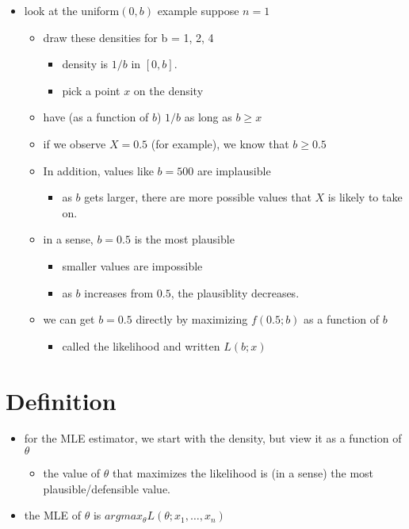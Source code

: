 \begin{itemize}
\item look at the uniform$(0,b)$ example suppose $n = 1$
\begin{itemize}
\item draw these densities for b = 1, 2, 4
\begin{itemize}
\item density is $1/b$ in $[0,b]$.
\item pick a point $x$ on the density
\end{itemize}
\item have (as a function of $b$) $1/b$ as long as $b \geq x$
\item if we observe $X = 0.5$ (for example), we know that $b \geq 0.5$
\item In addition, values like $b = 500$ are implausible
\begin{itemize}
\item as $b$ gets larger, there are more possible values that $X$ is
         likely to take on.
\end{itemize}
\item in a sense, $b = 0.5$ is the most plausible
\begin{itemize}
\item smaller values are impossible
\item as $b$ increases from $0.5$, the plausiblity decreases.
\end{itemize}
\item we can get $b = 0.5$ directly by maximizing $f(0.5; b)$ as a
       function of $b$
\begin{itemize}
\item called the likelihood and written $L(b; x)$
\end{itemize}
\end{itemize}
\end{itemize}

\section{Definition}

\begin{itemize}
\item for the MLE estimator, we start with the density, but view it as a
     function of $\theta$
\begin{itemize}
\item the value of $\theta$ that maximizes the likelihood is (in a sense) the most plausible/defensible value.
\end{itemize}
\item the MLE of $\theta$ is $argmax_\theta L(\theta; x_1,\dots,x_n)$
\end{itemize}


